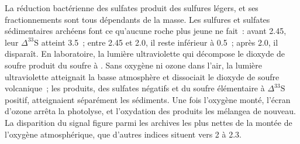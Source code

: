 La réduction bactérienne des sulfates produit des sulfures légers, et ses fractionnements
sont tous dépendants de la masse. Les sulfures et sulfates sédimentaires archéens font
ce qu'aucune roche plus jeune ne fait~: avant \qty{2.45}{\Ga}, leur $\Delta^{33}\mathrm S$
atteint \qty{3.5}{\permil}~; entre 2.45 et \qty{2.0}{\Ga}, il reste inférieur à
\qty{0.5}{\permil}~; après \qty{2.0}{\Ga}, il disparaît. En laboratoire,
la lumière ultraviolette qui décompose le dioxyde de soufre produit du soufre à
. Sans oxygène ni ozone dans l'air, la lumière ultraviolette atteignait la basse
atmosphère et dissociait le dioxyde de soufre volcanique~; les produits, des sulfates
négatifs et du soufre élémentaire à $\Delta^{33}\mathrm S$ positif, atteignaient
séparément les sédiments. Une fois l'oxygène monté, l'écran d'ozone arrêta la
photolyse, et l'oxydation des produits les mélangea de nouveau. La
disparition du signal figure parmi les archives les plus nettes de la montée de
l'oxygène atmosphérique, que d'autres indices situent vers 2 à
\qty{2.3}{\Ga}.

\begin{omfigure}

\par{}\label{fig:b3:stable-isotopes:three-isotope}
\end{omfigure}

